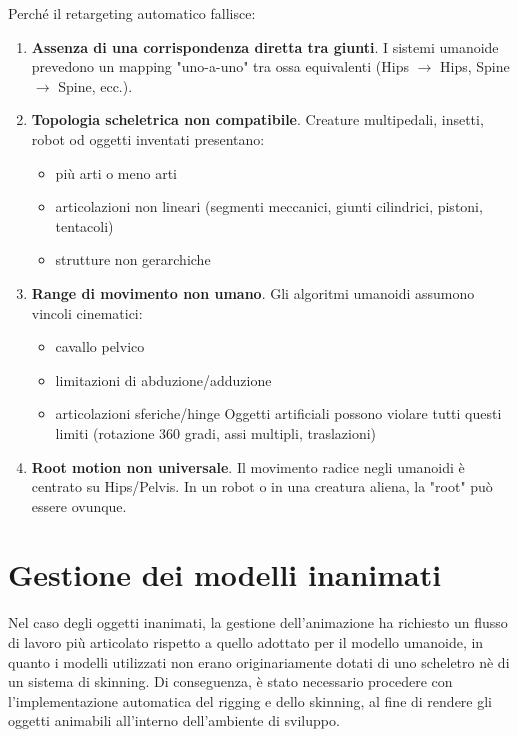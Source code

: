 Perché il retargeting automatico fallisce:
\begin{enumerate}
    \item \textbf{Assenza di una corrispondenza diretta tra giunti}.
    I sistemi umanoide prevedono un mapping "uno-a-uno" tra ossa equivalenti (Hips $\rightarrow$ Hips, Spine $\rightarrow$ Spine, ecc.).
    
    \item \textbf{Topologia scheletrica non compatibile}.
    Creature multipedali, insetti, robot od oggetti inventati presentano:
    \begin{itemize}
        \item più arti o meno arti
        \item articolazioni non lineari (segmenti meccanici, giunti cilindrici, pistoni, tentacoli)
        \item strutture non gerarchiche
    \end{itemize}
    \item \textbf{Range di movimento non umano}.
    Gli algoritmi umanoidi assumono vincoli cinematici:
    \begin{itemize}
        \item cavallo pelvico
        \item limitazioni di abduzione/adduzione
        \item articolazioni sferiche/hinge
            Oggetti artificiali possono violare tutti questi limiti (rotazione 360 gradi, assi multipli, traslazioni)
    \end{itemize}
    \item \textbf{Root motion non universale}.
    Il movimento radice negli umanoidi è centrato su Hips/Pelvis. In un robot o in una creatura aliena, la "root" può essere ovunque.
\end{enumerate}

\section{Gestione dei modelli inanimati}

Nel caso degli oggetti inanimati, la gestione dell'animazione ha richiesto un flusso di lavoro più articolato rispetto a quello adottato per il modello umanoide, in quanto i modelli utilizzati non erano originariamente dotati di uno scheletro nè di un sistema di skinning. Di conseguenza, è stato necessario procedere con l'implementazione automatica del rigging e dello skinning, al fine di rendere gli oggetti animabili all'interno dell'ambiente di sviluppo.

